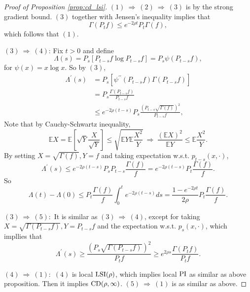 \begin{proof}[Proof of Proposition \ref{prop:cd_lsi}]
    $(1) ~\Rightarrow~ (2) ~\Rightarrow~ (3)$ is by the strong gradient bound. $(3)$ together with Jensen's inequality implies that
    \begin{equation*}
        \Gamma\left(P_t f\right) \leq e^{-2 \rho t} P_t \Gamma(f),
    \end{equation*}
    which follows that $(1)$.

    $(3)~\Rightarrow~(4)$: Fix $t > 0$ and define
    \begin{equation*}
        \Lambda(s)=P_s\left[P_{t-s} f \log P_{t-s} f\right] = P_s \psi\left(P_{t-s} f\right),
    \end{equation*}
    for $\psi(x) = x \log x$. So by $(3)$,
    \begin{align*}
        \Lambda^\prime(s) &=P_s\left[\psi^{\prime \prime}\left(P_{t-s} f\right) \Gamma\left(P_{t-s} f\right)\right] \\
        &= P_s \frac{\Gamma\left(P_{t-s} f\right)}{P_{t-s} f} \\
        &\leq e^{-2 \rho(t-s)} P_s \frac{\left(P_{t-s} \sqrt{\Gamma(f)}\right)^2}{P_{t-s} f},
    \end{align*}
    Note that by Cauchy-Schwartz inequality,
    \begin{equation*}
        \mathbb{E} X=\mathbb{E}\left[\sqrt{Y} \frac{X}{\sqrt{Y}}\right] \leq \sqrt{\mathbb{E} Y \mathbb{E} \frac{X^2}{Y}} ~\Rightarrow~ \frac{(\mathbb{E} X)^2}{\mathbb{E} Y} \leq \mathbb{E} \frac{X^2}{Y}.
    \end{equation*}
    By setting $X = \sqrt{\Gamma(f)},Y=f$ and taking expectation w.s.t. $p_{t-s}(x,\cdot)$,
    \begin{equation*}
        \Lambda^{\prime}(s) \leq e^{-2 \rho(t-s)} P_s P_{t-s} \frac{\Gamma(f)}{f}=e^{-2 \rho(t-s)} P_t \frac{\Gamma(f)}{f} .
    \end{equation*}
    So
    \begin{equation*}
        \Lambda(t)-\Lambda(0) \leq P_t \frac{\Gamma(f)}{f} \int_0^t e^{-2 \rho(t-s)} d s=\frac{1-e^{-2 \rho t}}{2 \rho} P_t \frac{\Gamma(f)}{f}.
    \end{equation*}

    $(3)~\Rightarrow~(5):$ It is similar as $(3)~\Rightarrow~(4)$, except for taking $X=\sqrt{\Gamma\left(P_{t-s} f\right)}, Y=P_{t-s} f$ and the expectation w.s.t. $p_s(x, \cdot)$, which impllies that
    \begin{equation*}
        \Lambda^{\prime}(s) \geq \frac{\left(P_s \sqrt{\Gamma\left(P_{t-s} f\right)}\right)^2}{P_t f} \geq e^{2 \rho s} \frac{\Gamma\left(P_t f\right)}{P_t f}.
    \end{equation*}

    $(4)~\Rightarrow~(1):$ $(4)$ is local $\operatorname{LSI}(\rho)$, which implies local $\operatorname{PI}$ as similar as above proposition. Then it implies $\operatorname{CD}(\rho,\infty)$. $(5)~\Rightarrow~(1)$ is as similar as above.
\end{proof}

